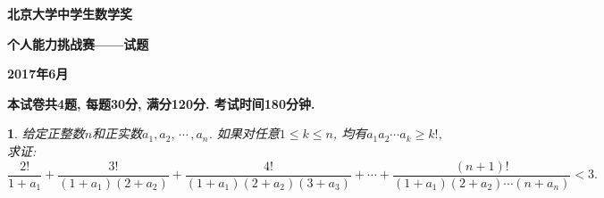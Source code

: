 \documentclass[10.5pt,a4paper,openany]{book}
\newtheorem{kong}{\qquad \bf \!\!}
\def\leq{\leqslant}
\def\geq{\geqslant}
\def\tcdots{\,\!\cdots\!\,}
\begin{document}
    \renewcommand{\baselinestretch}{1.25}\normalsize
    \setlength{\parindent}{2em}
    \setlength{\abovedisplayskip}{1pt}
    \setlength{\belowdisplayskip}{1pt}
    \pagestyle{empty}
    \begin{center}
        {\bf \Large 北京大学中学生数学奖}

        \vspace*{2mm}

        {\bf \LARGE 个人能力挑战赛——试题}

        \vspace*{2mm}

        {\bf \Large 2017年6月}
    \end{center}

    {\bf 本试卷共4题, 每题30分, 满分120分. 考试时间180分钟.}

    \begin{kong}\rm
        给定正整数$n$和正实数$a_1,a_2,\tcdots ,a_n$. 如果对任意$1\leq k\leq n$, 均有$a_1a_2\cdots a_k\geq k!$, 求证:$$\frac{2!}{1+a_1}+\frac{3!}{(1+a_1)(2+a_2)}+\frac{4!}{(1+a_1)(2+a_2)(3+a_3)}+\cdots+\frac{(n+1)!}{(1+a_1)(2+a_2)\cdots (n+a_n)}<3.$$
    \end{kong}
\end{document}
